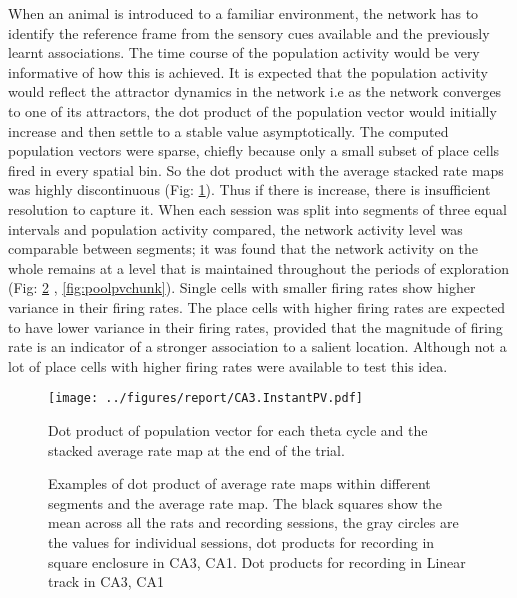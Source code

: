 When an animal is introduced to a familiar environment, the network has to identify the reference frame from the sensory cues available and the previously learnt associations. The time course of the population activity would be very informative of how this is achieved. It is expected that the population activity would reflect the attractor dynamics in the network i.e as the network converges to one of its attractors, the dot product of the population vector would initially increase and then settle to a stable value asymptotically. The computed population vectors were sparse, chiefly because only a small subset of place cells fired in every spatial bin. So the dot product with the average stacked rate maps was highly discontinuous (Fig: \ref{fig:tpv}). Thus if there is increase, there is insufficient resolution to capture it. 
When each session was split into segments of three equal intervals and population activity compared, the network activity level was comparable between segments; it was found that the network activity on the whole remains at a level that is maintained throughout the periods of exploration (Fig: \ref{fig:pvchunks} , \ref{fig:poolpvchunk}). Single cells with smaller firing rates show higher variance in their firing rates. The place cells with higher firing rates are expected to have lower variance in their firing rates, provided that the magnitude of firing rate is an indicator of a stronger association to a salient location. Although not a lot of place cells with higher firing rates were available to test this idea.\\
\begin{figure}[htb!]
\centering
\texttt{[image: ../figures/report/CA3.InstantPV.pdf]}
\caption[Population vector, fine time scale]{Dot product of population vector for each theta cycle and the stacked average rate map at the end of the trial.}
\label{fig:tpv}
\end{figure}

\begin{figure}[htb!]
\centering
{}
\caption[Average population vectors]{Examples of dot product of average rate maps within different segments and the average rate map. The black squares show the mean across all the rats and recording sessions, the gray circles are the values for individual sessions, dot products for recording in square enclosure in  CA3,  CA1. Dot products for recording in Linear track in  CA3,  CA1}
\label{fig:pvchunks}
\end{figure}

